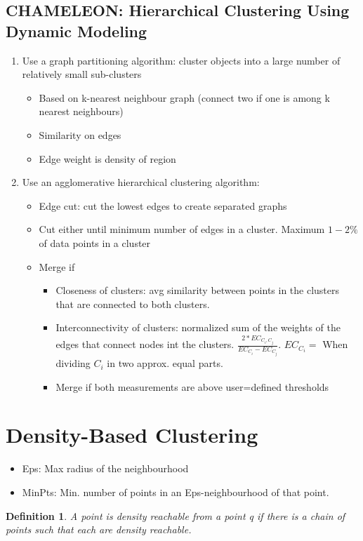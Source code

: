\documentclass[a4paper]{article}
\newtheorem{definition}{Definition}
\begin{document}
\subsection{CHAMELEON: Hierarchical Clustering Using Dynamic Modeling}
\begin{enumerate}
	\item Use a graph partitioning algorithm: cluster objects into a large
		number of relatively small sub-clusters
		\begin{itemize}
			\item Based on k-nearest neighbour graph (connect two if
				one is among k nearest neighbours)
			\item Similarity on edges
			\item Edge weight is density of region
		\end{itemize}
	\item Use an agglomerative hierarchical clustering algorithm:
		\begin{itemize}
			\item Edge cut: cut the lowest edges to create separated
				graphs
			\item Cut either until minimum number of edges in a
				cluster. Maximum $1-2\%$ of data points in a
				cluster
			\item Merge if
				\begin{itemize}
					\item Closeness of clusters: avg
						similarity between points in the
						clusters that are connected to
						both clusters.
					\item Interconnectivity of clusters:
						normalized sum of the weights of
						the edges that connect nodes int
						the clusters.
						$\frac{2*EC_{C_i,C_j}}{EC_{C_i}-EC_{C_j}}$.
						$EC_{C_i}=$ When dividing
						$C_i$ in two approx. equal
						parts.
					\item Merge if both measurements are
						above user=defined thresholds
				\end{itemize}
		\end{itemize}
\end{enumerate}
\section{Density-Based Clustering}
\begin{itemize}
	\item Eps: Max radius of the neighbourhood
	\item MinPts: Min. number of points in an Eps-neighbourhood of that
		point.
\end{itemize}
\begin{definition}
	A point is density reachable from a point q if there is a chain of
	points such that each are density reachable.
\end{definition}
\end{document}
